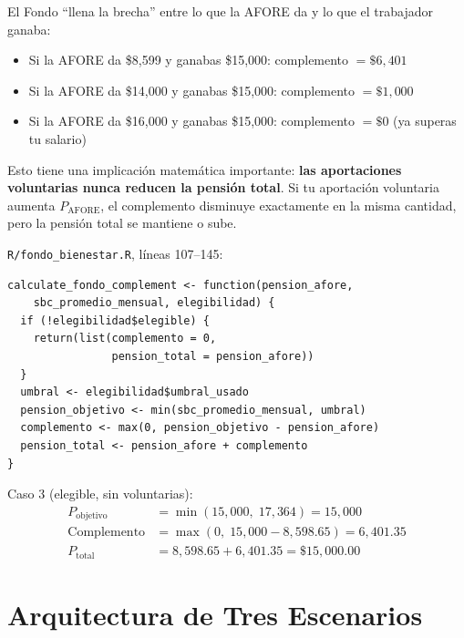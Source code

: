 \documentclass[11pt,a4paper]{report}
\theoremstyle{remark}
\begin{document}
\begin{tcolorbox}[colback=green!5!white, colframe=green!50!black, title=\textbf{Intuici\'on}]
El Fondo ``llena la brecha'' entre lo que la AFORE da y lo que el trabajador ganaba:
\begin{itemize}
  \item Si la AFORE da \$8,599 y ganabas \$15,000: complemento $= \$6{,}401$
  \item Si la AFORE da \$14,000 y ganabas \$15,000: complemento $= \$1{,}000$
  \item Si la AFORE da \$16,000 y ganabas \$15,000: complemento $= \$0$ (ya superas tu salario)
\end{itemize}

Esto tiene una implicaci\'on matem\'atica importante: \textbf{las aportaciones voluntarias nunca reducen la pensi\'on total}. Si tu aportaci\'on voluntaria aumenta $P_{\text{AFORE}}$, el complemento disminuye exactamente en la misma cantidad, pero la pensi\'on total se mantiene o sube.
\end{tcolorbox}

\begin{tcolorbox}[colback=orange!5!white, colframe=orange!75!black, title=\textbf{Aplicaci\'on en C\'odigo}]
\texttt{R/fondo\_bienestar.R}, l\'ineas 107--145:
\begin{lstlisting}
calculate_fondo_complement <- function(pension_afore,
    sbc_promedio_mensual, elegibilidad) {
  if (!elegibilidad$elegible) {
    return(list(complemento = 0,
                pension_total = pension_afore))
  }
  umbral <- elegibilidad$umbral_usado
  pension_objetivo <- min(sbc_promedio_mensual, umbral)
  complemento <- max(0, pension_objetivo - pension_afore)
  pension_total <- pension_afore + complemento
}
\end{lstlisting}

Caso 3 (elegible, sin voluntarias):
\begin{align*}
P_{\text{objetivo}} &= \min(15{,}000, \; 17{,}364) = 15{,}000 \\
\text{Complemento} &= \max(0, \; 15{,}000 - 8{,}598.65) = 6{,}401.35 \\
P_{\text{total}} &= 8{,}598.65 + 6{,}401.35 = \$15{,}000.00
\end{align*}
\end{tcolorbox}

\section{Arquitectura de Tres Escenarios}
\end{document}
